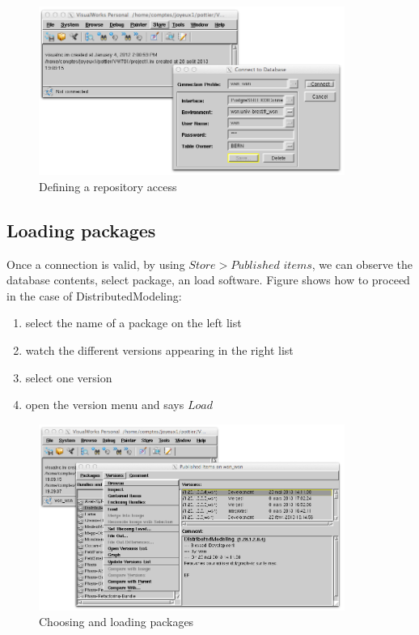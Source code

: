 \documentclass[times]{book}
\begin{document}
\begin{figure}[hbtp]
\begin{center} 
\includegraphics[width=10cm]{store-access.png}
\caption{Defining a repository access }
\label{fig:store-access}
\end{center}
\end{figure}

\subsection {Loading packages }

Once a connection is valid, by using $Store>Published$ $items$, we can observe the database contents, select
package, an load software. Figure \label{fig:store-load} shows how to proceed in the case of DistributedModeling:

\begin{enumerate}
\item select the name of a package on the left list
\item watch the different versions appearing in the right list
\item select one version
\item open the version menu and says $Load$
\end{enumerate}

\begin{figure}[hbtp]
\begin{center} 
\includegraphics[width=10cm]{store-load.png}
\caption{Choosing and loading packages}
\label{fig:store-load}
\end{center}
\end{figure}
\end{document}

